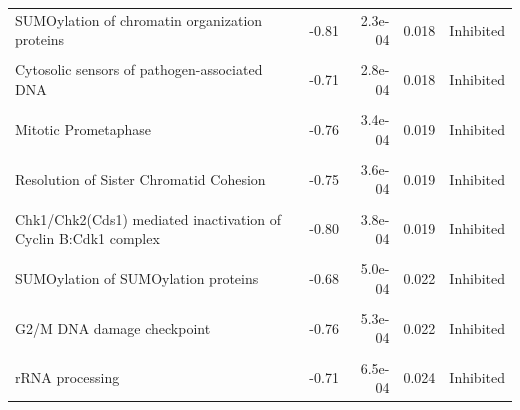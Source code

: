 \documentclass[9pt,a4paper,]{extarticle}
\begin{document}
\begin{table}
{\begin{tabular}[t]{lrrrl}
SUMOylation of chromatin organization proteins & -0.81 & 2.3e-04 & 0.018 & Inhibited\\
\cellcolor{gray!6}{SUMOylation of DNA damage response and repair proteins} & \cellcolor{gray!6}{-0.75} & \cellcolor{gray!6}{2.5e-04} & \cellcolor{gray!6}{0.018} & \cellcolor{gray!6}{Inhibited}\\
\addlinespace
Cytosolic sensors of pathogen-associated DNA & -0.71 & 2.8e-04 & 0.018 & Inhibited\\
\cellcolor{gray!6}{SUMOylation of transcription cofactors} & \cellcolor{gray!6}{-0.71} & \cellcolor{gray!6}{2.9e-04} & \cellcolor{gray!6}{0.018} & \cellcolor{gray!6}{Inhibited}\\
Mitotic Prometaphase & -0.76 & 3.4e-04 & 0.019 & Inhibited\\
\cellcolor{gray!6}{G0 and Early G1} & \cellcolor{gray!6}{0.81} & \cellcolor{gray!6}{3.4e-04} & \cellcolor{gray!6}{0.019} & \cellcolor{gray!6}{Activated}\\
Resolution of Sister Chromatid Cohesion & -0.75 & 3.6e-04 & 0.019 & Inhibited\\
\addlinespace
\cellcolor{gray!6}{Transcription of E2F targets under negative control by p107 (RBL1) and p130 (RBL2) in complex with HDAC1} & \cellcolor{gray!6}{0.77} & \cellcolor{gray!6}{3.6e-04} & \cellcolor{gray!6}{0.019} & \cellcolor{gray!6}{Activated}\\
Chk1/Chk2(Cds1) mediated inactivation of Cyclin B:Cdk1 complex & -0.80 & 3.8e-04 & 0.019 & Inhibited\\
\cellcolor{gray!6}{Activation of the pre-replicative complex} & \cellcolor{gray!6}{-0.77} & \cellcolor{gray!6}{4.1e-04} & \cellcolor{gray!6}{0.019} & \cellcolor{gray!6}{Inhibited}\\
SUMOylation of SUMOylation proteins & -0.68 & 5.0e-04 & 0.022 & Inhibited\\
\cellcolor{gray!6}{Cyclin A/B1/B2 associated events during G2/M transition} & \cellcolor{gray!6}{-0.75} & \cellcolor{gray!6}{5.1e-04} & \cellcolor{gray!6}{0.022} & \cellcolor{gray!6}{Inhibited}\\
\addlinespace
G2/M DNA damage checkpoint & -0.76 & 5.3e-04 & 0.022 & Inhibited\\
\cellcolor{gray!6}{Major pathway of rRNA processing in the nucleolus and cytosol} & \cellcolor{gray!6}{-0.71} & \cellcolor{gray!6}{6.5e-04} & \cellcolor{gray!6}{0.024} & \cellcolor{gray!6}{Inhibited}\\
rRNA processing & -0.71 & 6.5e-04 & 0.024 & Inhibited\\

\end{tabular}}
\end{table}
\end{document}
